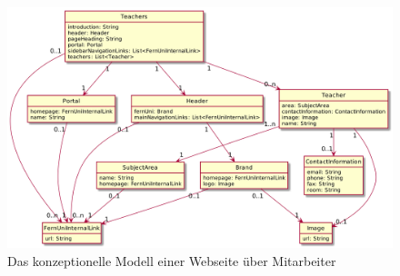     \begin{figure}[htb]
        \centering
        \includegraphics[scale=\imageScalingFactor]{../resources/findings/case-study-1/model/model.png}
        \caption{Das konzeptionelle Modell einer Webseite über Mitarbeiter}
        \label{image:findingTeachersModelUml}
    \end{figure}